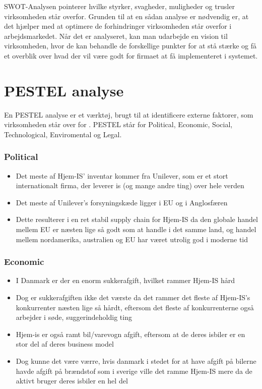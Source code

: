 SWOT-Analysen\cite{Organisation} pointerer hvilke styrker, svagheder, muligheder og trusler virksomheden står overfor. Grunden til at en sådan analyse er nødvendig er, at det hjælper med at optimere de forhindringer virksomheden står overfor i arbejdsmarkedet. Når det er analyseret, kan man udarbejde en vision til virksomheden, hvor de kan behandle de forskellige punkter for at stå stærke og få et overblik over hvad der vil være godt for firmaet at få implementeret i systemet.

\section{PESTEL analyse}
En PESTEL analyse er et værktøj, brugt til at identificere externe faktorer, som virksomheden står over for \cite{Oxford}. PESTEL står for Political, Economic, Social, Technological, Enviromental og Legal. 
\subsubsection{Political}
\begin{itemize}
    \item Det meste af Hjem-IS’ inventar kommer fra Unilever, som er et stort internationalt firma, der leverer is (og mange andre ting) over hele verden
    \item Det meste af Unilever’s forsyningskæde ligger i EU og i Anglosfæren
    \item Dette resulterer i en ret stabil supply chain for Hjem-IS da den globale handel mellem EU er næsten lige så godt som at handle i det samme land, og handel mellem nordamerika, australien og EU har været utrolig god i moderne tid
\end{itemize}
\subsubsection{Economic}
\begin{itemize}
    \item I Danmark er der en enorm sukkerafgift, hvilket rammer Hjem-IS hård
    \item Dog er sukkerafgiften ikke det værste da det rammer det fleste af Hjem-IS’s konkurrenter næsten lige så hårdt, eftersom det fleste af konkurrenterne også arbejder i søde, suggerindeholdig ting
    \item Hjem-is er også ramt bil/varevogn afgift, eftersom at de deres isbiler er en stor del af deres business model
    \item Dog kunne det være værre, hvis danmark i stedet for at have afgift på bilerne havde afgift på brændstof som i sverige ville det ramme Hjem-IS mere da de aktivt bruger deres isbiler en hel del
\end{itemize}
